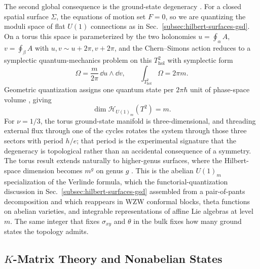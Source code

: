 The second global consequence is the ground-state degeneracy \cite{WenNiu1990GroundStateDegeneracy}. For a closed spatial surface $\Sigma$, the equations of motion set $F=0$, so we are quantizing the moduli space of flat $U(1)$ connections as in Sec.~\ref{subsec:hilbert-surfaces-gsd}. On a torus this space is parameterized by the two holonomies $u=\oint_\alpha A$, $v=\oint_\beta A$ with $u,v\sim u+2\pi,v+2\pi$, and the Chern--Simons action reduces to a symplectic quantum-mechanics problem on this $T^{2}_{\mathrm{hol}}$ with symplectic form
\begin{equation}
  \Omega = \frac{m}{2\pi}\,\dd u\wedge\dd v,
  \qquad
  \int_{T^{2}_{\mathrm{hol}}}\Omega = 2\pi m.
  \label{eq:fqhe-symplectic}
\end{equation}
Geometric quantization assigns one quantum state per $2\pi\hbar$ unit of phase-space volume \cite{ElitzurMooreSchwimmerSeiberg1989CanonicalCS}, giving
\begin{equation}
  \dim\mathcal{H}_{U(1)_m}(T^{2}) = m.
  \label{eq:fqhe-torus-degeneracy}
\end{equation}
For $\nu=1/3$, the torus ground-state manifold is three-dimensional, and threading external flux through one of the cycles rotates the system through those three sectors with period $h/e$; that period is the experimental signature that the degeneracy is topological rather than an accidental consequence of a symmetry. The torus result extends naturally to higher-genus surfaces, where the Hilbert-space dimension becomes $m^{g}$ on genus $g$ \cite{WenNiu1990GroundStateDegeneracy}. This is the abelian $U(1)_m$ specialization of the Verlinde formula, which the functorial-quantization discussion in Sec.~\ref{subsec:hilbert-surfaces-gsd} assembled from a pair-of-pants decomposition and which reappears in WZW conformal blocks, theta functions on abelian varieties, and integrable representations of affine Lie algebras at level $m$. The same integer that fixes $\sigma_{xy}$ and $\theta$ in the bulk fixes how many ground states the topology admits.

\subsection{$K$-Matrix Theory and Nonabelian States}
\label{subsec:k-matrix-nonabelian}

